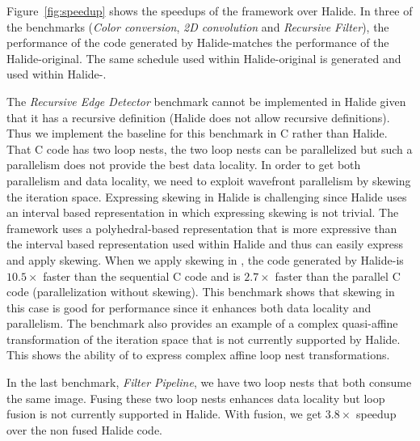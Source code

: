 Figure~\ref{fig:speedup} shows the speedups of the \framework framework over Halide.
In three of the benchmarks (\emph{Color conversion}, \emph{2D convolution} and \emph{Recursive Filter}), the performance of the code generated by Halide-\framework matches the performance of the Halide-original.  The same schedule used within Halide-original is generated and used within Halide-\framework.  

The \emph{Recursive Edge Detector} benchmark cannot be implemented in Halide given that it has a recursive definition (Halide does not allow recursive definitions).  Thus we implement the baseline for this benchmark in C rather than Halide.  That C code has two loop nests, the two loop nests can be parallelized but such a parallelism does not provide the best data locality.  In order to get both parallelism and data locality, we need to exploit wavefront parallelism by skewing the iteration space.  Expressing skewing in Halide is challenging since Halide uses an interval based representation in which expressing skewing is not trivial.  The \framework framework uses a polyhedral-based representation that is more expressive than the interval based representation used within Halide and thus \framework can easily express and apply skewing.
When we apply skewing in \framework, the code generated by Halide-\framework is $10.5\times$ faster than the sequential C code and is $2.7\times$ faster than the parallel C code (parallelization without skewing).  This benchmark shows that skewing in this case is good for performance since it enhances both data locality and
parallelism.
The benchmark also provides an example of a complex quasi-affine transformation of the iteration space that is not currently supported by Halide.  This shows the ability of \framework to express complex affine loop nest transformations.

In the last benchmark, \emph{Filter Pipeline}, we have two loop nests that both consume the same image.  Fusing these two loop nests enhances data locality but loop fusion is not currently supported in Halide.  With fusion, we get $3.8\times$ speedup over the non fused Halide code.

